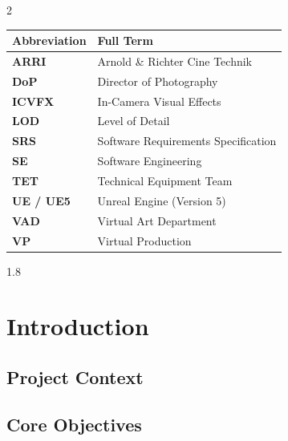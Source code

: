 \documentclass[12pt,a4paper]{report}
\begin{document}
\newpage
{}
\begin{spacing}{2}
    \renewcommand{\arraystretch}{1.5}
    \begin{center}
    \begin{tabular*}{\textwidth}{@{\extracolsep{\fill}}ll@{}}
        \toprule
        \large{\textbf{Abbreviation}} & \large{\textbf{Full Term}} \\
        \midrule
        \textbf{ARRI} & Arnold \& Richter Cine Technik \\
        \textbf{DoP} & Director of Photography \\
        \textbf{ICVFX} & In-Camera Visual Effects \\
        \textbf{LOD} & Level of Detail \\
        \textbf{SRS} & Software Requirements Specification \\
        \textbf{SE} & Software Engineering \\
        \textbf{TET} & Technical Equipment Team \\
        \textbf{UE / UE5} & Unreal Engine (Version 5) \\
        \textbf{VAD} & Virtual Art Department \\
        \textbf{VP} & Virtual Production \\
        \bottomrule
    \end{tabular*}
    \end{center}
    \renewcommand{\arraystretch}{1}
\end{spacing}


\newpage
\begin{spacing}{1.8}
    \tableofcontents
\end{spacing}
\newpage


\chapter{Introduction}

\section{Project Context}

\section{Core Objectives}
\end{document}
